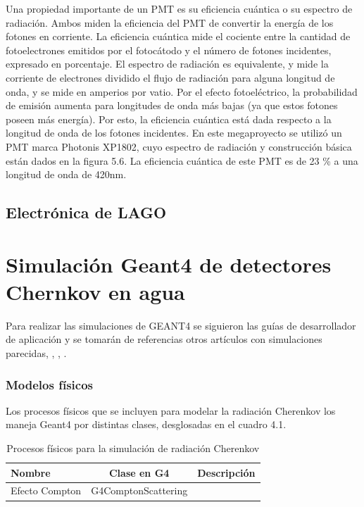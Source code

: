 \documentclass{book}
\begin{document}
Una propiedad importante de un PMT es su eficiencia cu\'antica o su espectro de radiaci\'on. Ambos miden la eficiencia del PMT de convertir la energ\'ia de los fotones en corriente. La eficiencia cu\'antica mide el cociente entre la cantidad de fotoelectrones emitidos por el fotoc\'atodo y el n\'umero de fotones incidentes, expresado en porcentaje. El espectro de radiaci\'on es equivalente, y mide la corriente de electrones dividido el flujo de radiaci\'on para alguna longitud de onda, y se mide en amperios por vatio. Por el efecto fotoel\'ectrico, la probabilidad de emisi\'on aumenta para longitudes de onda m\'as bajas (ya que estos fotones poseen m\'as energ\'ia). Por esto, la eficiencia cu\'antica est\'a dada respecto a la longitud de onda de los fotones incidentes. En este megaproyecto se utiliz\'o un PMT marca Photonis XP1802, cuyo espectro de radiaci\'on y construcci\'on b\'asica est\'an dados en la figura 5.6. La eficiencia cu\'antica de este PMT es de 23 \% a una longitud de onda de 420nm. \citep{Hamamatsu} \citep{Photonis}

\subsection{Electr\'onica de LAGO}



\section{Simulaci\'on Geant4 de detectores Chernkov en agua}

Para realizar las simulaciones de GEANT4 se siguieron las gu\'ias de desarrollador de aplicaci\'on y se tomar\'an de referencias otros art\'iculos con simulaciones parecidas, \citep{NIELSEN}, \citep{CHEN}, \citep{CALDERON}.

\subsubsection{Modelos f\'isicos}

Los procesos f\'isicos que se incluyen para modelar la radiaci\'on Cherenkov los maneja Geant4 por distintas clases, desglosadas en el cuadro 4.1.

\begin{table}[h]
\caption{ Procesos f\'isicos para la simulaci\'on de radiaci\'on Cherenkov}
\centering
\begin{tabular}{l c c}
\hline
Nombre & Clase en G4 & Descripci\'on\\ \hline
Efecto Compton & G4ComptonScattering & \\

\hline
\end{tabular}
\end{table}
\end{document}
